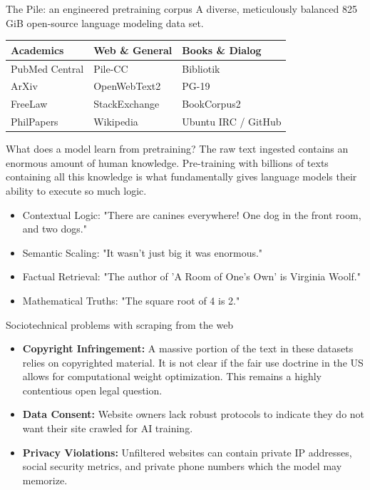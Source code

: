 \documentclass[aspectratio=169]{beamer}
\begin{document}
\begin{frame}{The Pile: an engineered pretraining corpus}\justifying
    A diverse, meticulously balanced 825 GiB open-source language modeling data set.
    \vspace{0.5cm}
    \begin{table}
        \centering
        \begin{tabular}{lll}
            \toprule
            \textbf{Academics} & \textbf{Web \& General} & \textbf{Books \& Dialog} \\
            \midrule
            PubMed Central & Pile-CC & Bibliotik \\
            ArXiv & OpenWebText2 & PG-19 \\
            FreeLaw & StackExchange & BookCorpus2 \\
            PhilPapers & Wikipedia & Ubuntu IRC / GitHub \\
            \bottomrule
        \end{tabular}
    \end{table}
\end{frame}

\begin{frame}{What does a model learn from pretraining?}\justifying
    The raw text ingested contains an enormous amount of human knowledge. Pre-training with billions of texts containing all this knowledge is what fundamentally gives language models their ability to execute so much logic.
    \begin{itemize}
        \item Contextual Logic: "There are canines everywhere! One dog in the front room, and two dogs."
        \item Semantic Scaling: "It wasn't just big it was enormous."
        \item Factual Retrieval: "The author of 'A Room of One's Own' is Virginia Woolf."
        \item Mathematical Truths: "The square root of 4 is 2."
    \end{itemize}
\end{frame}

\begin{frame}{Sociotechnical problems with scraping from the web}\justifying
    \begin{itemize}
        \item \textbf{Copyright Infringement:} A massive portion of the text in these datasets relies on copyrighted material. It is not clear if the fair use doctrine in the US allows for computational weight optimization. This remains a highly contentious open legal question.
        \item \textbf{Data Consent:} Website owners lack robust protocols to indicate they do not want their site crawled for AI training.
        \item \textbf{Privacy Violations:} Unfiltered websites can contain private IP addresses, social security metrics, and private phone numbers which the model may memorize.
    \end{itemize}
\end{frame}
\end{document}
